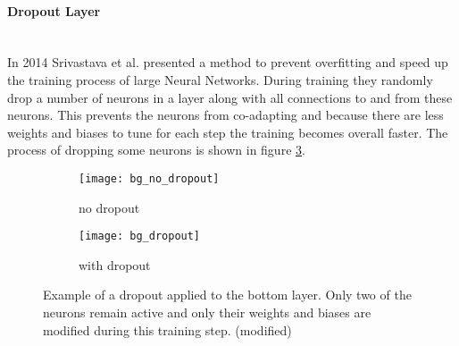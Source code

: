 \paragraph{Dropout Layer} ~\\
In 2014 Srivastava et al.\cite{Srivastava2014} presented a method to prevent overfitting and speed up the training process of large Neural Networks. During training they randomly drop a number of neurons in a layer along with all connections to and from these neurons. This prevents the neurons from co-adapting  and because there are less weights and biases to tune for each step the training becomes overall faster. The process of dropping some neurons is shown in figure \ref{fig:bg:dropout}.

\begin{figure}[H]
\centering
\begin{subfigure}{.5\textwidth}
    \centering
    \texttt{[image: bg\_no\_dropout]}
    \caption{no dropout}
    \label{}
\end{subfigure}%
\begin{subfigure}{.5\textwidth}
    \centering
    \texttt{[image: bg\_dropout]}
    \caption{with dropout}
    \label{}
\end{subfigure}
\caption{Example of a dropout applied to the bottom layer. Only two of the neurons remain active and only their weights and biases are modified during this training step. \cite{Srivastava2014} (modified)}
\label{fig:bg:dropout}
\end{figure}
